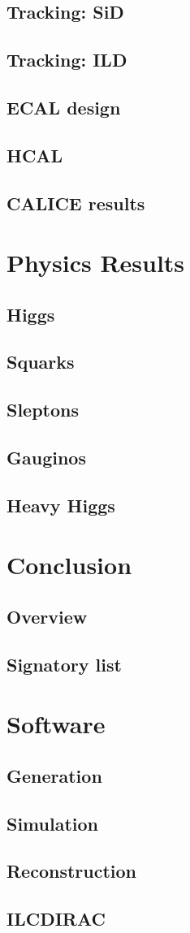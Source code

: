 \documentclass{beamer}
\begin{document}
\subsection{Tracking: SiD}
\subsection{Tracking: ILD}
\subsection{ECAL design}
\subsection{HCAL}
\subsection{CALICE results}

\section{Physics Results}
\subsection{Higgs}
\subsection{Squarks}
\subsection{Sleptons}
\subsection{Gauginos}
\subsection{Heavy Higgs}

\section{Conclusion}
\subsection{Overview}
\subsection{Signatory list}

\appendix
\section{Software}
\subsection{Generation}
\subsection{Simulation}
\subsection{Reconstruction}
\subsection{ILCDIRAC}
\end{document}
